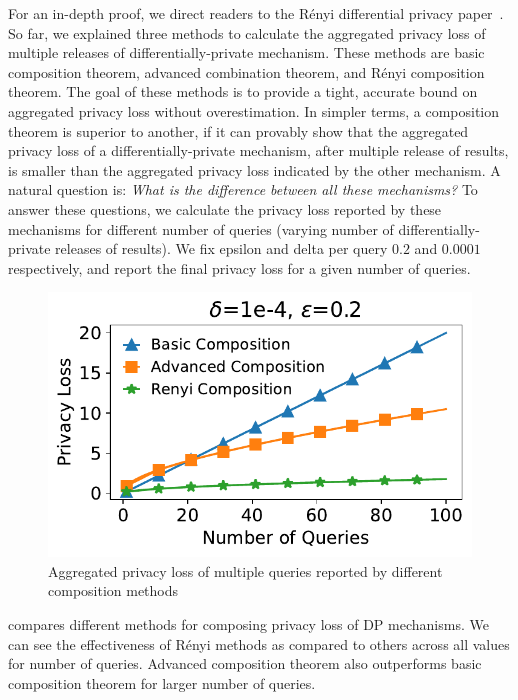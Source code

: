 \noindent For an in-depth proof, we direct readers to the R\'enyi differential privacy paper~\cite{mironov2017renyi}.
So far, we explained three methods to calculate the aggregated privacy loss of multiple releases of differentially-private mechanism.
These methods are basic composition theorem, advanced combination theorem, and R\'enyi composition theorem.
The goal of these methods is to provide a tight, accurate bound on aggregated privacy loss without overestimation. 
In simpler terms, a composition theorem is superior to another, if it can provably show that the aggregated privacy loss of a differentially-private mechanism, after multiple release of results, is smaller than the aggregated privacy loss indicated by the other mechanism.
A natural question is: \textit{What is the difference between all these mechanisms?}
To answer these questions, we calculate the privacy loss reported by these mechanisms for different number of queries (\ie varying number of differentially-private releases of results).
We fix epsilon and delta per query $0.2$ and $0.0001$ respectively, and report the final privacy loss for a given number of queries.
\begin{figure}[t]
  \centering
  \includegraphics[width=\columnwidth]{plots/composition_comparison.pdf}
  \caption{Aggregated privacy loss of multiple queries reported by different composition methods}
  \label{fig:composition-comparison}
\end{figure}

 compares different methods for composing privacy loss of DP mechanisms.
We can see the effectiveness of R\'enyi methods as compared to others across all values for number of queries.
Advanced composition theorem also outperforms basic composition theorem for larger number of queries. 


